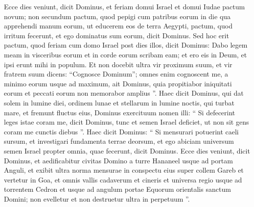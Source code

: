 \begin{biblechapter}
\begin{biblechapter}
\begin{biblechapter}
\begin{biblechapter}
\begin{biblechapter}
\begin{biblechapter}
\begin{biblechapter}
\begin{biblechapter}
\begin{biblechapter}
\begin{biblechapter}
\begin{biblechapter}
\begin{biblechapter}
\begin{biblechapter}
\begin{biblechapter}
\begin{biblechapter}
\begin{biblechapter}
\begin{biblechapter}
\begin{biblechapter}
\begin{biblechapter}
\begin{biblechapter}
\begin{biblechapter}
\begin{biblechapter}
\begin{biblechapter}
\begin{biblechapter}
\begin{biblechapter}
\begin{biblechapter}
\begin{biblechapter}
\begin{biblechapter}
\begin{biblechapter}
\begin{biblechapter}
\begin{biblechapter}
 \verse Ecce dies veniunt, dicit Dominus, et feriam domui Israel et domui Iudae pactum novum; 
\verse non secundum pactum, quod pepigi cum patribus eorum in die qua apprehendi manum eorum, ut educerem eos de terra Aegypti, pactum, quod irritum fecerunt, et ego dominatus sum eorum, dicit Dominus. 
\verse Sed hoc erit pactum, quod feriam cum domo Israel post dies illos, dicit Dominus: Dabo legem meam in visceribus eorum et in corde eorum scribam eam; et ero eis in Deum, et ipsi erunt mihi in populum. 
\verse Et non docebit ultra vir proximum suum, et vir fratrem suum dicens: “Cognosce Dominum”; omnes enim cognoscent me, a minimo eorum usque ad maximum, ait Dominus, quia propitiabor iniquitati eorum et peccati eorum non memorabor amplius ”.
 \verse Haec dicit Dominus,
 qui dat solem in lumine diei,
 ordinem lunae et stellarum in lumine noctis,
 qui turbat mare, et fremunt fluctus eius,
 Dominus exercituum nomen illi:
 \verse “ Si defecerint leges istae coram me,
 dicit Dominus,
 tunc et semen Israel deficiet,
 ut non sit gens coram me cunctis diebus ”.
 \verse Haec dicit Dominus:
 “ Si mensurari potuerint caeli sursum,
 et investigari fundamenta terrae deorsum,
 et ego abiciam universum semen Israel
 propter omnia, quae fecerunt,
 dicit Dominus.
 \verse Ecce dies veniunt, dicit Dominus, et aedificabitur civitas Domino a turre Hananeel usque ad portam Anguli, 
\verse et exibit ultra norma mensurae in conspectu eius super collem Gareb et vertetur in Goa, 
\verse et omnis vallis cadaverum et cineris et universa regio usque ad torrentem Cedron et usque ad angulum portae Equorum orientalis sanctum Domini; non evelletur et non destruetur ultra in perpetuum ”.
 

\end{biblechapter}
\end{biblechapter}
\end{biblechapter}
\end{biblechapter}
\end{biblechapter}
\end{biblechapter}
\end{biblechapter}
\end{biblechapter}
\end{biblechapter}
\end{biblechapter}
\end{biblechapter}
\end{biblechapter}
\end{biblechapter}
\end{biblechapter}
\end{biblechapter}
\end{biblechapter}
\end{biblechapter}
\end{biblechapter}
\end{biblechapter}
\end{biblechapter}
\end{biblechapter}
\end{biblechapter}
\end{biblechapter}
\end{biblechapter}
\end{biblechapter}
\end{biblechapter}
\end{biblechapter}
\end{biblechapter}
\end{biblechapter}
\end{biblechapter}
\end{biblechapter}

